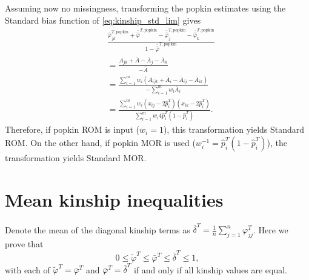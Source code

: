 \documentclass[9pt,twocolumn,twoside]{gsajnl}
\newcommand{\xij}[1][j]{x_{i#1}}
\newcommand{\pith}{\hat{p}_i^T}
\newcommand{\kt}[1][k]{\varphi_{j#1}^T}
\newcommand{\ktHatNamed}[2][k]{\hat{\varphi}_{j#1}^{T,\text{#2}}}
\newcommand{\Ajk}[1][k]{A_{j#1}}
\newcommand{\AMinHat}{\hat{A}_{\text{min}}}
\begin{document}
\begin{appendices}
  Assuming now no missingness, transforming the popkin estimates using the Standard bias function of \cref{eq:kinship_std_lim} gives
  \begin{align*}
    & \frac{
      \ktHatNamed{popkin}
      + \bar{ \hat{ \varphi } }^{T,\text{popkin}}
      - \bar{ \hat{ \varphi } }_j^{T,\text{popkin}}
      - \bar{ \hat{ \varphi } }_k^{T,\text{popkin}}
      }{
      1 - \bar{ \hat{ \varphi } }^{T,\text{popkin}}
      }
    \\
    &=
      \frac{
      \Ajk
      + \bar{A}
      - \bar{A}_j
      - \bar{A}_k
      }{
      - \bar{A}
      }
    \\
    &=
      \frac{
      \sum_{i=1}^m w_i ( A_{ijk} + \bar{A}_i - \bar{A}_{ij} - \bar{A}_{ik} )
      }{
      - \sum_{i=1}^m w_i \bar{A}_i
      }
    \\
    &=
      \frac{
      \sum_{i=1}^m w_i \left( \xij - 2 \pith \right) \left( \xij[k] - 2 \pith \right)
      }{
      \sum_{i=1}^m w_i 4 \pith \left( 1 - \pith \right)
      }
      .
  \end{align*}
  Therefore, if popkin ROM is input ($w_i=1$), this transformation yields Standard ROM.
  On the other hand, if popkin MOR is used ($w_i^{-1} = \pith \left( 1 - \pith \right)$), the transformation yields Standard MOR.
  
  \section{Mean kinship inequalities}

  \label{sec:mean_kinship_ineqs}

  Denote the mean of the diagonal kinship terms as $\bar{\delta}^T = \frac{1}{n} \sum_{j=1}^n \kt[j]$.
  Here we prove that
  $$
  0 \le \tilde{\varphi}^T \le \bar{\varphi}^T \le \bar{\delta}^T \le 1,
  $$
  with each of $\tilde{\varphi}^T = \bar{\varphi}^T$ and $\bar{\varphi}^T = \bar{\delta}^T$ if and only if all kinship values are equal.


\end{appendices}
\end{document}

